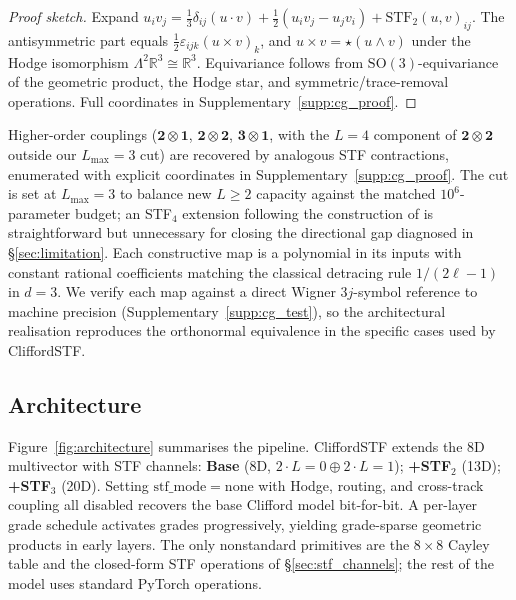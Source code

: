 \begin{proof}[Proof sketch]
Expand $u_iv_j = \tfrac{1}{3}\delta_{ij}(u\cdot v) + \tfrac{1}{2}(u_iv_j - u_jv_i) + \mathrm{STF}_2(u,v)_{ij}$. The antisymmetric part equals $\tfrac{1}{2}\varepsilon_{ijk}(u\times v)_k$, and $u\times v = \star(u\wedge v)$ under the Hodge isomorphism $\Lambda^2\mathbb{R}^3 \cong \mathbb{R}^3$. Equivariance follows from $\mathrm{SO}(3)$-equivariance of the geometric product, the Hodge star, and symmetric/trace-removal operations. Full coordinates in Supplementary~\ref{supp:cg_proof}.
\end{proof}

Higher-order couplings ($\mathbf{2}\otimes\mathbf{1}$, $\mathbf{2}\otimes\mathbf{2}$, $\mathbf{3}\otimes\mathbf{1}$, with the $L{=}4$ component of $\mathbf{2}\otimes\mathbf{2}$ outside our $L_{\max}{=}3$ cut) are recovered by analogous STF contractions, enumerated with explicit coordinates in Supplementary~\ref{supp:cg_proof}. The cut is set at $L_{\max}{=}3$ to balance new $L{\geq}2$ capacity against the matched $10^6$-parameter budget; an STF$_4$ extension following the construction of \citet{shao2025orthonormal} is straightforward but unnecessary for closing the directional gap diagnosed in \S\ref{sec:limitation}. Each constructive map is a polynomial in its inputs with constant rational coefficients matching the classical detracing rule $1/(2\ell-1)$ in $d=3$. We verify each map against a direct Wigner $3j$-symbol reference to machine precision (Supplementary~\ref{supp:cg_test}), so the architectural realisation reproduces the orthonormal equivalence in the specific cases used by CliffordSTF.

\subsection{Architecture}\label{sec:architecture}

Figure~\ref{fig:architecture} summarises the pipeline. CliffordSTF extends the 8D multivector with STF channels: \textbf{Base} (8D, $2\cdot L{=}0 \oplus 2\cdot L{=}1$); \textbf{+STF$_2$} (13D); \textbf{+STF$_3$} (20D). Setting $\mathrm{stf\_mode}{=}\text{none}$ with Hodge, routing, and cross-track coupling all disabled recovers the base Clifford model bit-for-bit. A per-layer grade schedule activates grades progressively, yielding grade-sparse geometric products in early layers. The only nonstandard primitives are the $8\times8$ Cayley table and the closed-form STF operations of \S\ref{sec:stf_channels}; the rest of the model uses standard PyTorch operations.

